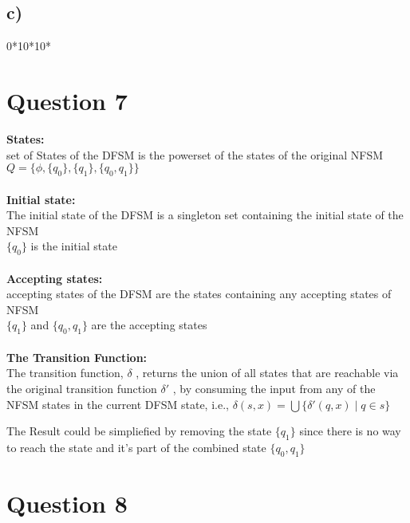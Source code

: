 \documentclass[11pt]{article}
\begin{document}
\subsection*{c)}
0*10*10*

\section*{Question 7}
\textbf{States:} \\
set of States of the DFSM is the powerset of the states of the original NFSM \\
$Q = \{\phi, \{q_0\}, \{q_1\}, \{q_0, q_1\}\}$ \\
\\
\textbf{Initial state:} \\
The initial state of the DFSM is a singleton set containing the initial state of the NFSM \\
$\{q_0\}$ is the initial state \\
\\
\textbf{Accepting states:} \\
accepting states of the DFSM are the states containing any accepting states of NFSM \\
$\{q_1\}$ and $\{q_0, q_1\}$ are the accepting states \\
\\
\textbf{The Transition Function:} \\
The transition function, $\delta$ , returns the union of all states that are
reachable via the original transition function $\delta'$ , by consuming the
input from any of the NFSM states in the current DFSM state, i.e.,
$\delta(s, x) = \bigcup \{ \delta'(q, x) \mid q \in s \}$

The Result could be simpliefied by removing the state $\{q_1\}$ since there is no way
to reach the state and it's part of the combined state $\{q_0, q_1\}$


\section*{Question 8}
\end{document}
